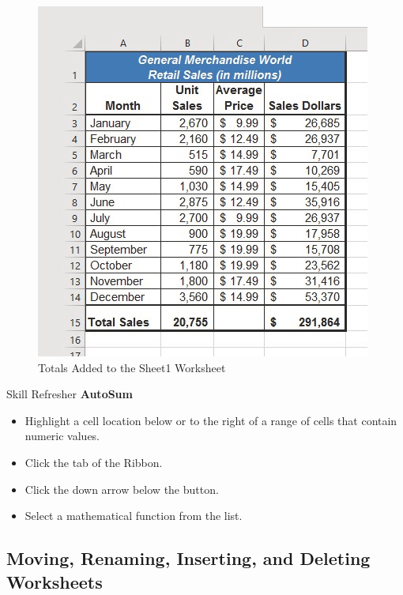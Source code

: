 \begin{figure}[H]
	\centering
	\includegraphics[width=\maxwidth{.95\linewidth}]{gfx/ch01_fig46}
	\caption{Totals Added to the Sheet1 Worksheet}
	\label{01:fig46}
\end{figure}

\begin{center}
	\begin{sklbox}{Skill Refresher}
		\textbf{AutoSum}
		\\
		\begin{itemize}
			\setlength{\itemsep}{0pt}
			\setlength{\parskip}{0pt}
			\setlength{\parsep}{0pt}
			
			\item Highlight a cell location below or to the right of a range of cells that contain numeric values.
			\item Click the  tab of the Ribbon.
			\item Click the down arrow below the  button.
			\item Select a mathematical function from the list.
			
		\end{itemize}
	\end{sklbox}
\end{center}

\subsection{Moving, Renaming, Inserting, and Deleting Worksheets}

